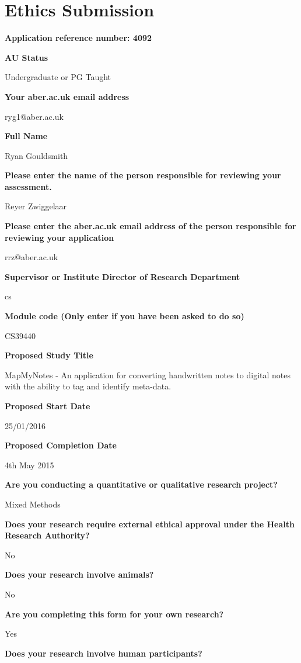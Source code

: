 \chapter{Ethics Submission}

\textbf{Application reference number: 4092}

\textbf{AU Status}

Undergraduate or PG Taught

\textbf{Your aber.ac.uk email address}

ryg1@aber.ac.uk

\textbf{Full Name}

Ryan Gouldsmith

\textbf{Please enter the name of the person responsible for reviewing your assessment.}

Reyer Zwiggelaar

\textbf{Please enter the aber.ac.uk email address of the person responsible for reviewing your application}

rrz@aber.ac.uk

\textbf{Supervisor or Institute Director of Research Department}

cs

\textbf{Module code (Only enter if you have been asked to do so)}

CS39440

\textbf{Proposed Study Title}

MapMyNotes - An application for converting handwritten notes to digital notes with the ability to tag and identify meta-data.

\textbf{Proposed Start Date}

25/01/2016

\textbf{Proposed Completion Date}

4th May 2015

\textbf{Are you conducting a quantitative or qualitative research project?}

Mixed Methods

\textbf{Does your research require external ethical approval under the Health Research Authority?}

No

\textbf{Does your research involve animals?}

No

\textbf{Are you completing this form for your own research?}

Yes

\textbf{Does your research involve human participants?}

